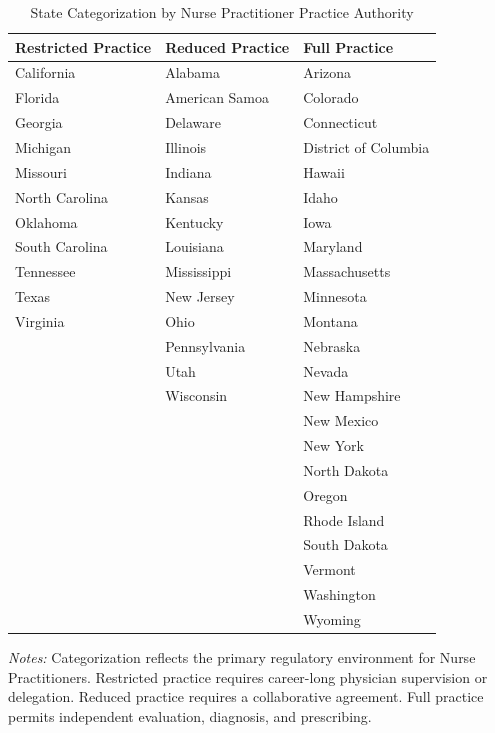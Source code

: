 \begin{table}[htbp]
    \centering
    \caption{State Categorization by Nurse Practitioner Practice Authority}
    \label{tab:np_authority_appendix}
    \vspace{0.2cm}
    \begin{tabular}{p{4.5cm} p{4.5cm} p{4.5cm}}
        \toprule
        \textbf{Restricted Practice} & \textbf{Reduced Practice} & \textbf{Full Practice} \\
        \midrule
        California & Alabama & Arizona \\
        Florida & American Samoa & Colorado \\
        Georgia & Delaware & Connecticut \\
        Michigan & Illinois & District of Columbia \\
        Missouri & Indiana & Hawaii \\
        North Carolina & Kansas & Idaho \\
        Oklahoma & Kentucky & Iowa \\
        South Carolina & Louisiana & Maryland \\
        Tennessee & Mississippi & Massachusetts \\
        Texas & New Jersey & Minnesota \\
        Virginia & Ohio & Montana \\
         & Pennsylvania & Nebraska \\
         & Utah & Nevada \\
         & Wisconsin & New Hampshire \\
         &  & New Mexico \\
         &  & New York \\
         &  & North Dakota \\
         &  & Oregon \\
         &  & Rhode Island \\
         &  & South Dakota \\
         &  & Vermont \\
         &  & Washington \\
         &  & Wyoming \\
        \bottomrule
    \end{tabular}
    \vspace{0.1cm}
    \begin{minipage}{0.9\textwidth}
        \footnotesize \textit{Notes:} Categorization reflects the primary regulatory environment for Nurse Practitioners. Restricted practice requires career-long physician supervision or delegation. Reduced practice requires a collaborative agreement. Full practice permits independent evaluation, diagnosis, and prescribing. 
    \end{minipage}
\end{table}